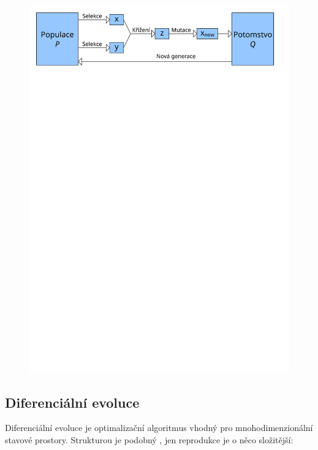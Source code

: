 \begin{figure}[h!]\label{EA fig}
  \includegraphics[width=\textwidth]{img/EA}
\end{figure}





\subsection{Diferenciální evoluce}

Diferenciální evoluce \cite{DE Storn} je optimalizační algoritmus vhodný pro mnohodimenzionální stavové prostory. Strukturou je podobný , jen reprodukce je o něco složitější:

